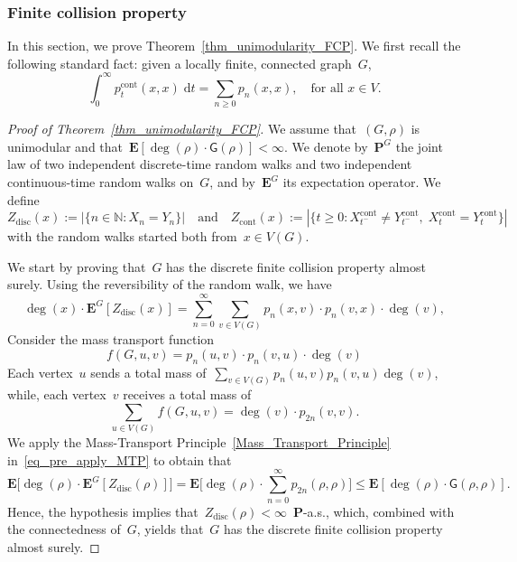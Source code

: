 \documentclass[a4paper,11pt]{article}
\newcommand{\NN}{\mathbb{N}}
\theoremstyle{definition}
\begin{document}
\subsubsection{Finite collision property}\label{ss_finite_coll_prop}
In this section, we prove Theorem~\ref{thm_unimodularity_FCP}. We first recall the following standard fact: given a locally finite, connected graph~$G$, 
\begin{equation}\label{eq_standar_cont_disc}
\int^\infty_0 p^\mathrm{cont}_t(x,x) \; \mathrm{d}t = \sum_{n \ge 0}p_n(x,x), \quad \text{for all } x \in V.
\end{equation}

\begin{proof}[Proof of Theorem~\ref{thm_unimodularity_FCP}] We assume that~$(G,\rho)$ is unimodular and that~$\mathbf{E} [\deg(\rho) \cdot \mathsf G(\rho)] < \infty$. We denote by~$\mathbf P^G$ the joint law of two independent discrete-time random walks and two independent continuous-time random walks on~$G$, and by~$\mathbf E^G$ its expectation operator. We define
$$ Z_\mathrm{disc}(x) := |\{n \in \NN: X_n = Y_n\}| \quad \text{and} \quad Z_\mathrm{cont}(x) := |\{ t \ge 0: X^\mathrm{cont}_{t^-} \neq Y^\mathrm{cont}_{t^-}, \; X^\mathrm{cont}_t = Y^\mathrm{cont}_t \}| $$
with the random walks started both from~$x \in V(G)$. 

We start by proving that~$G$ has the discrete finite collision property almost surely. Using the reversibility of the random walk, we have 
\begin{equation}\label{eq_pre_apply_MTP}
    \deg(x) \cdot \mathbf E^G [Z_\mathrm{disc}(x)] = \sum^\infty_{n = 0} \sum_{v \in V(G)} p_n(x,v) \cdot p_n(v,x) \cdot \deg(v),
\end{equation}
Consider the mass transport function
$$ f(G,u,v) = p_n(u,v) \cdot p_n(v,u) \cdot \deg(v) $$
Each vertex~$u$ sends a total mass of~$\sum_{v \in V(G)}p_n(u,v) p_n(v,u) \deg(v)$, while, each vertex~$v$ receives a total mass of
$$ \sum_{u \in V(G)} f(G,u,v) = \deg(v) \cdot p_{2n}(v,v). $$
We apply the Mass-Transport Principle~\eqref{Mass_Transport_Principle} in~\eqref{eq_pre_apply_MTP} to obtain that 
$$ \mathbf{E} \big[ \deg(\rho) \cdot \mathbf E^G[Z_\mathrm{disc}(\rho) ] \big] = \mathbf{E} \big[ \deg(\rho) \cdot \sum^\infty_{n = 0} p_{2n}(\rho,\rho) \big] \leq \mathbf E[ \deg(\rho) \cdot \mathsf G(\rho,\rho) ]. $$
Hence, the hypothesis implies that~$Z_\mathrm{disc}(\rho)<\infty$~$\mathbf P$-a.s., which, combined with the connectedness of~$G$, yields that~$G$ has the discrete finite collision property almost surely.


\end{proof}
\end{document}

